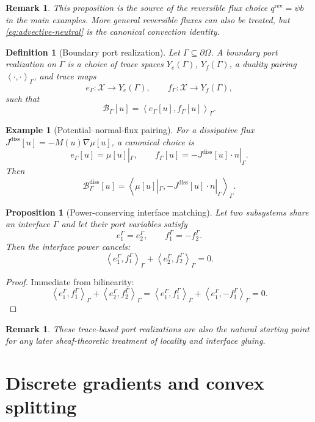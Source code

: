 \documentclass[11pt]{article}
\newtheorem{proposition}[theorem]{Proposition}
\newtheorem{definition}[theorem]{Definition}
\newtheorem{remark}[theorem]{Remark}
\newtheorem{example}[theorem]{Example}
\newcommand{\Om}{\Omega}
\newcommand{\pa}{\partial}
\newcommand{\grad}{\nabla}
\newcommand{\X}{\mathcal{X}}
\newcommand{\Bnd}{\mathcal{B}}
\newcommand{\pair}[2]{\left\langle #1,#2\right\rangle}
\begin{document}
\begin{remark}
This proposition is the source of the reversible flux choice \(q^{\mathrm{rev}}=\psi b\)
in the main examples. More general reversible fluxes can also be treated, but
\eqref{eq:advective-neutral} is the canonical convection identity.
\end{remark}

\begin{definition}[Boundary port realization]
Let \(\Gamma\subseteq \pa\Om\). A \emph{boundary port realization} on \(\Gamma\) is a
choice of trace spaces \(Y_e(\Gamma)\), \(Y_f(\Gamma)\), a duality pairing
\(\pair{\cdot}{\cdot}_\Gamma\), and trace maps
\[
e_\Gamma:\X\to Y_e(\Gamma),\qquad f_\Gamma:\X\to Y_f(\Gamma),
\]
such that
\[
\Bnd_\Gamma[u]=\pair{e_\Gamma[u]}{f_\Gamma[u]}_\Gamma.
\]
\end{definition}

\begin{example}[Potential--normal-flux pairing]
For a dissipative flux \(J^{\mathrm{diss}}[u]=-M(u)\grad \mu[u]\), a canonical choice is
\[
e_\Gamma[u]=\mu[u]|_\Gamma,
\qquad
f_\Gamma[u]=-J^{\mathrm{diss}}[u]\cdot n|_\Gamma.
\]
Then
\[
\Bnd_\Gamma^{\mathrm{diss}}[u]
=
\pair{\mu[u]|_\Gamma}{-J^{\mathrm{diss}}[u]\cdot n|_\Gamma}_\Gamma.
\]
\end{example}

\begin{proposition}[Power-conserving interface matching]
Let two subsystems share an interface \(\Gamma\) and let their port variables satisfy
\[
e_1^\Gamma=e_2^\Gamma,
\qquad
f_1^\Gamma=-f_2^\Gamma.
\]
Then the interface power cancels:
\[
\pair{e_1^\Gamma}{f_1^\Gamma}_\Gamma
+
\pair{e_2^\Gamma}{f_2^\Gamma}_\Gamma
=0.
\]
\end{proposition}

\begin{proof}
Immediate from bilinearity:
\[
\pair{e_1^\Gamma}{f_1^\Gamma}_\Gamma
+
\pair{e_2^\Gamma}{f_2^\Gamma}_\Gamma
=
\pair{e_1^\Gamma}{f_1^\Gamma}_\Gamma
+
\pair{e_1^\Gamma}{-f_1^\Gamma}_\Gamma
=0.
\]
\end{proof}

\begin{remark}
These trace-based port realizations are also the natural starting point for any later
sheaf-theoretic treatment of locality and interface gluing.
\end{remark}

\section{Discrete gradients and convex splitting}
\end{document}
